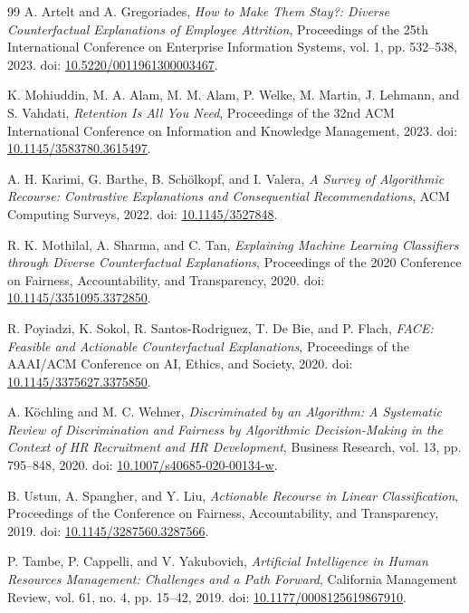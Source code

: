 \documentclass[11pt]{article}
\begin{document}
\begin{thebibliography}{99}
A. Artelt and A. Gregoriades, \emph{How to Make Them Stay?: Diverse Counterfactual Explanations of Employee Attrition}, Proceedings of the 25th International Conference on Enterprise Information Systems, vol. 1, pp. 532--538, 2023. doi: \href{https://doi.org/10.5220/0011961300003467}{10.5220/0011961300003467}.

K. Mohiuddin, M. A. Alam, M. M. Alam, P. Welke, M. Martin, J. Lehmann, and S. Vahdati, \emph{Retention Is All You Need}, Proceedings of the 32nd ACM International Conference on Information and Knowledge Management, 2023. doi: \href{https://doi.org/10.1145/3583780.3615497}{10.1145/3583780.3615497}.

A. H. Karimi, G. Barthe, B. Sch{\"o}lkopf, and I. Valera, \emph{A Survey of Algorithmic Recourse: Contrastive Explanations and Consequential Recommendations}, ACM Computing Surveys, 2022. doi: \href{https://doi.org/10.1145/3527848}{10.1145/3527848}.

R. K. Mothilal, A. Sharma, and C. Tan, \emph{Explaining Machine Learning Classifiers through Diverse Counterfactual Explanations}, Proceedings of the 2020 Conference on Fairness, Accountability, and Transparency, 2020. doi: \href{https://doi.org/10.1145/3351095.3372850}{10.1145/3351095.3372850}.

R. Poyiadzi, K. Sokol, R. Santos-Rodriguez, T. De Bie, and P. Flach, \emph{FACE: Feasible and Actionable Counterfactual Explanations}, Proceedings of the AAAI/ACM Conference on AI, Ethics, and Society, 2020. doi: \href{https://doi.org/10.1145/3375627.3375850}{10.1145/3375627.3375850}.

A. K{\"o}chling and M. C. Wehner, \emph{Discriminated by an Algorithm: A Systematic Review of Discrimination and Fairness by Algorithmic Decision-Making in the Context of HR Recruitment and HR Development}, Business Research, vol. 13, pp. 795--848, 2020. doi: \href{https://doi.org/10.1007/s40685-020-00134-w}{10.1007/s40685-020-00134-w}.

B. Ustun, A. Spangher, and Y. Liu, \emph{Actionable Recourse in Linear Classification}, Proceedings of the Conference on Fairness, Accountability, and Transparency, 2019. doi: \href{https://doi.org/10.1145/3287560.3287566}{10.1145/3287560.3287566}.

P. Tambe, P. Cappelli, and V. Yakubovich, \emph{Artificial Intelligence in Human Resources Management: Challenges and a Path Forward}, California Management Review, vol. 61, no. 4, pp. 15--42, 2019. doi: \href{https://doi.org/10.1177/0008125619867910}{10.1177/0008125619867910}.


\end{thebibliography}
\end{document}
